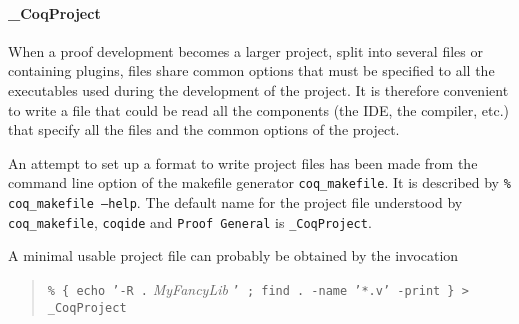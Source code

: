 \paragraph{\_CoqProject}
When a proof development becomes a larger project, split into several
files or containing {\ocaml} plugins, files share common options that
must be specified to all the executables used during the development
of the project. It is therefore convenient to write a file that could
be read all the components (the IDE, the compiler, etc.) that
specify all the files and the common options of the project.

An attempt to set up a format to write project files has been made
from the command line option of the {\Coq} makefile generator
\texttt{coq\_makefile}. It is described by \texttt{\% coq\_makefile
  --help}. The default name for the project file understood by
\texttt{coq\_makefile}, \texttt{coqide} and \texttt{Proof General} is
\texttt{\_CoqProject}.

A minimal usable project file can probably be obtained by the
invocation
\begin{quotation}
\texttt{\% \{ echo '-R .} \textit{MyFancyLib} \texttt{' ; find . -name
  '*.v' -print \} > \_CoqProject}
\end{quotation}

